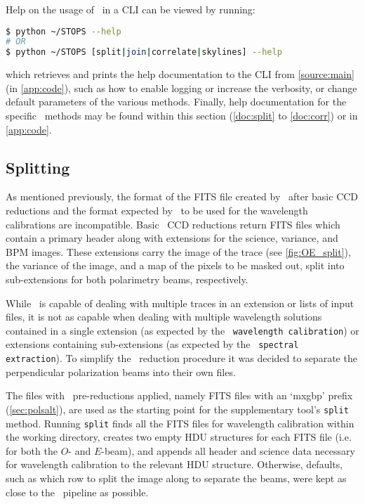Help on the usage of \stops\ in a \gls{CLI} can be viewed by running:
\begin{lstlisting}[language=bash]
$ python ~/STOPS --help
# OR
$ python ~/STOPS [split|join|correlate|skylines] --help
\end{lstlisting}
{\parskip=0pt which} retrieves and prints the help documentation to the \gls{CLI} from \autoref{source:main} (in \autoref{app:code}), such as how to enable logging or increase the verbosity, or change default parameters of the various methods. Finally, help documentation for the specific \stops\ methods may be found within this section (\autoref{doc:split} to \ref{doc:corr}) or in \autoref{app:code}.

\subsection{Splitting} \label{subsec:stops_split}



As mentioned previously, the format of the \gls{FITS} file created by \polsalt\ after basic \gls{CCD} reductions and the format expected by \iraf\ to be used for the wavelength calibrations are incompatible. Basic \polsalt\ \gls{CCD} reductions return \gls{FITS} files which contain a primary header along with extensions for the science, variance, and \gls{BPM} images. These extensions carry the image of the trace (see \autoref{fig:OE_split}), the variance of the image, and a map of the pixels to be masked out, split into sub-extensions for both polarimetry beams, respectively.

While \iraf\ is capable of dealing with multiple traces in an extension or lists of input files, it is not as capable when dealing with multiple wavelength solutions contained in a single extension (as expected by the \polsalt\ \texttt{wavelength calibration}) or extensions containing sub-extensions (as expected by the \polsalt\ \texttt{spectral extraction}). To simplify the \iraf\ reduction procedure it was decided to separate the perpendicular polarization beams into their own files.

The files with \polsalt\ pre-reductions applied, namely \gls{FITS} files with an `mxgbp' prefix (\autoref{sec:polsalt}), are used as the starting point for the supplementary tool's \texttt{split} method. Running \texttt{split} finds all the \gls{FITS} files for wavelength calibration within the working directory, creates two empty \gls{HDU} structures for each \gls{FITS} file (i.e. for both the $O$- and $E$-beam), and appends all header and science data necessary for wavelength calibration to the relevant \gls{HDU} structure. Otherwise, defaults, such as which row to split the image along to separate the beams, were kept as close to the \polsalt\ pipeline as possible.

